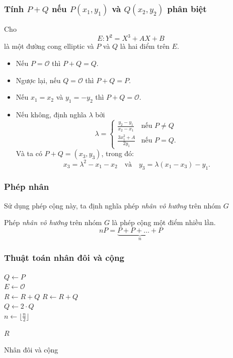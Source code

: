 \documentclass [xcolor=svgnames, t] {beamer}
\theoremstyle{definition}
\begin{document}
\begin{frame}
    \frametitle{Tính $P+Q$ nếu $P(x_1,y_1)$ và $Q(x_2,y_2)$ phân biệt  }
    Cho
    $$E:Y^2 = X^3 + AX + B$$
    là một đường cong elliptic và $P$  và $Q$ là hai điểm trên $E$.
    \begin{itemize}
        \item Nếu $P = \mathcal{O}$ thì $P + Q = Q$.
        \item Ngược lại, nếu $Q = \mathcal{O}$ thì $P + Q = P$.
        \item Nếu $x_1 = x_2$ và $y_1 = -y_2$ thì $P + Q = \mathcal{O}$.
        \item Nếu không, định nghĩa $\lambda$ bởi
              $$ \lambda = \begin{cases}
                      \frac{y_2-y_1}{x_2 - x_1} & \text{nếu } P \neq Q \\
                      \frac{3x_1^2 + A}{2y_1}   & \text{nếu } P = Q.
                  \end{cases} $$
              Và ta có $P + Q = (x_3, y_3)$, trong đó:
              $$x_3 = \lambda^2 - x_1 - x_2 \ \ \  \text{ và } \ \ \  y_3 = \lambda(x_1 - x_3) - y_1.$$
    \end{itemize}


\end{frame}
\begin{frame}
    \frametitle{Phép nhân}
    Sử dụng phép cộng này, ta định nghĩa phép \textit{nhân vô hướng} trên nhóm $G$
    \begin{definition}
        Phép \textit{nhân vô hướng} trên nhóm $G$ là phép cộng một điểm nhiều lần.
        \begin{equation}
            nP = \underbrace{P+P+ \ldots +P}_{n}
        \end{equation}
    \end{definition}
\end{frame}
\begin{frame}
    \frametitle{Thuật toán nhân đôi và cộng}

    \begin{algorithm}[H]
        \Begin
        {
            $Q \gets P$ \\
            $E \gets \mathcal{O}$ \\
            {
                {
                    $R \gets R + Q$
                }
                {
                    $R \gets R + Q$ \\
                    $Q \gets 2 \cdot Q$ \\
                    $n \gets \lfloor \frac{n}{2} \rfloor $
                }
            }

            \Return $R$
        }
        \caption{Nhân đôi và cộng}
    \end{algorithm}

\end{frame}
\end{document}
